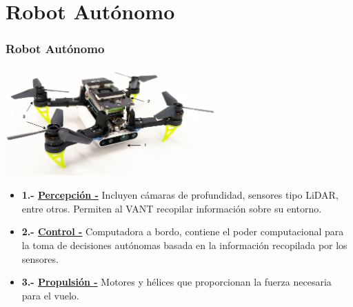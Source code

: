 \documentclass[
  24pt, %
  aspectratio=169, %
]{beamer}
\begin{document}
\section{Robot Autónomo}
\begin{frame}
  \frametitle{Robot Autónomo}

  \centering
  \includegraphics[width=8cm]{drone_taxo}
  \bigskip %
  \begin{itemize}
  \item \textbf{1.- \underline{Percepción -}} Incluyen cámaras de profundidad, sensores tipo LiDAR, entre otros. Permiten al VANT recopilar información sobre su entorno.
  \item \textbf{2.- \underline{Control -}} Computadora a bordo, contiene el poder computacional para la toma de decisiones autónomas basada en la información recopilada por los sensores.
  \item \textbf{3.- \underline{Propulsión -}} Motores y hélices que proporcionan la fuerza necesaria para el vuelo.
  \end{itemize}
\end{frame}
\end{document}
